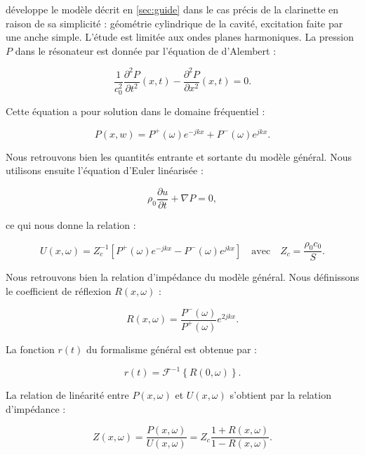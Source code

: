 \documentclass[atiam, article]{rapport} %
\begin{document}
\cite{maganza_bifurcations_1986} développe le modèle décrit en \ref{sec:guide} dans le cas précis de la clarinette en raison de sa simplicité : géométrie cylindrique de la cavité, excitation faite par une anche simple. L'étude est limitée aux ondes planes harmoniques. La pression $P$ dans le résonateur est donnée par l'équation de d'Alembert :

\begin{equation}
    \frac{1}{c_0^2}\frac{\partial ^2 P}{\partial t^2}(x,t) - \frac{\partial^2P}{\partial x^2}(x,t)=0.
\end{equation}

Cette équation a pour solution dans le domaine fréquentiel :

\begin{equation}
    P(x,w) = P^+(\omega)e^{-jkx}+P^-(\omega)e^{jkx}.
\end{equation}

Nous retrouvons bien les quantités entrante et sortante du modèle général. Nous utilisons ensuite l'équation d'Euler linéarisée :

\begin{equation}
    \rho_0\frac{\partial u}{\partial t}+\nabla P = 0,
\end{equation}

ce qui nous donne la relation :

\begin{equation}
    U(x,\omega) = Z_c^{-1}\left[P^+(\omega)e^{-jkx} - P^-(\omega)e^{jkx}\right] \quad\text{avec}\quad Z_c=\frac{\rho_0c_0}{S}.
\end{equation}

Nous retrouvons bien la relation d'impédance du modèle général. Nous définissons le coefficient de réflexion $R(x,\omega)$ :

\begin{equation}
    R(x,\omega)=\frac{P^-(\omega)}{P^+(\omega)}e^{2jkx}.
\end{equation}

La fonction $r(t)$ du formalisme général est obtenue par :

\begin{equation}
    r(t)=\mathcal{F}^{-1}\left\{R(0,\omega)\right\}.
\end{equation}

La relation de linéarité entre $P(x,\omega)$ et $U(x,\omega)$ s'obtient par la relation d'impédance :

\begin{equation}
    Z(x,\omega)=\frac{P(x,\omega)}{U(x,\omega)}=Z_c\frac{1+R(x,\omega)}{1-R(x,\omega)}.
\end{equation}
\end{document}
